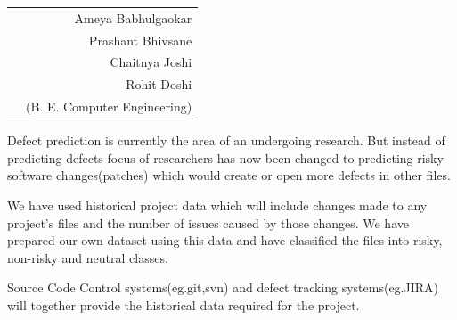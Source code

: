 \documentclass[oneside,a4paper,12pt]{book}
\begin{document}
\vspace*{2\baselineskip} 

\begin{tabular}{p{8.70cm}r}
&Ameya Babhulgaokar\\[3pt]
&Prashant Bhivsane \quad   \\[3pt]
&Chaitnya Joshi \quad \quad \\[3pt]
&Rohit Doshi \quad \quad \quad \\
&(B. E. Computer Engineering)
\end{tabular}

{ 
\setlength{\parindent}{11mm} }
{\setlength{\parindent}{0mm} }
\begin{justify}
Defect prediction is currently the area of an undergoing research.  But instead of predicting defects focus of researchers has now been changed to predicting risky software changes(patches) which would create or open more defects in other files.
\end{justify}\par
\begin{justify}
We have used historical project data which will include changes made to any project’s files and the number of issues caused by those changes.   We have prepared our own dataset using this data and have classified the files into risky, non-risky and neutral classes.
\end{justify}\par
\begin{justify}
Source Code Control systems(eg.git,svn) and defect tracking systems(eg.JIRA) will together provide the historical data required for the project.
\end{justify}\par

\vspace*{1\baselineskip}
\vspace*{1.5\baselineskip}

\tableofcontents

 \newpage
{} \newpage
{}

\newpage 


\vspace{\baselineskip}

\vspace{\baselineskip}
\end{document}
